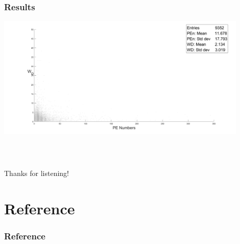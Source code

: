 \documentclass{beamer}
\begin{document}
\begin{frame}
    \frametitle{Results}
    \large
    \includegraphics[width = 0.9\textwidth]{s_WD.png}
\end{frame}

\begin{frame}
    \frametitle{\ }
    \Huge
    \centering
    Thanks for listening!
\end{frame}

\section{Reference}
\begin{frame}
    \frametitle{Reference}
    \large
    
\end{frame}
\end{document}
